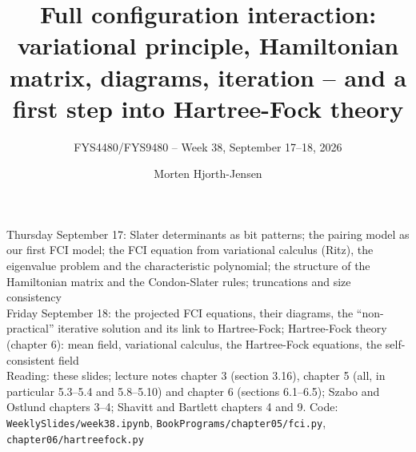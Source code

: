 \documentclass[aspectratio=169,10pt]{beamer}
\title{Full configuration interaction: variational principle, Hamiltonian matrix, diagrams, iteration -- and a first step into Hartree-Fock theory}
\subtitle{FYS4480/FYS9480 -- Week 38, September 17--18, 2026}
\author{Morten Hjorth-Jensen}
\institute{Department of Physics and Center for Computing in Science Education,\\
University of Oslo, Norway}
\date{}
\begin{document}
\begin{frame}[plain]
  \vfill
  \begin{center}\scriptsize
  Thursday September 17: Slater determinants as bit patterns; the pairing model as our first FCI model; the FCI equation from variational calculus (Ritz), the eigenvalue problem and the characteristic polynomial; the structure of the Hamiltonian matrix and the Condon-Slater rules; truncations and size consistency\\
  Friday September 18: the projected FCI equations, their diagrams, the ``non-practical'' iterative solution and its link to Hartree-Fock; Hartree-Fock theory (chapter 6): mean field, variational calculus, the Hartree-Fock equations, the self-consistent field\\[0.2em]
  Reading: these slides; lecture notes chapter 3 (section 3.16), chapter 5 (all, in particular 5.3--5.4 and 5.8--5.10) and chapter 6 (sections 6.1--6.5); Szabo and Ostlund chapters 3--4; Shavitt and Bartlett chapters 4 and 9. Code: \texttt{WeeklySlides/week38.ipynb}, \texttt{BookPrograms/chapter05/fci.py}, \texttt{chapter06/hartreefock.py}
  \end{center}
\end{frame}
\end{document}
